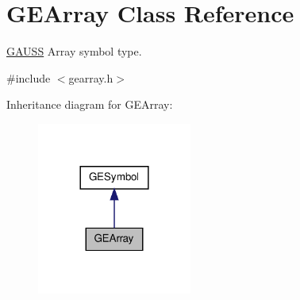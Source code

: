 \hypertarget{class_g_e_array}{\section{G\-E\-Array Class Reference}
\label{class_g_e_array}
}


\hyperlink{class_g_a_u_s_s}{G\-A\-U\-S\-S} Array symbol type.  




{\ttfamily \#include $<$gearray.\-h$>$}



Inheritance diagram for G\-E\-Array\-:\nopagebreak
\begin{figure}[H]
\begin{center}
\leavevmode
\includegraphics[width=144pt]{class_g_e_array__inherit__graph}
\end{center}
\end{figure}
